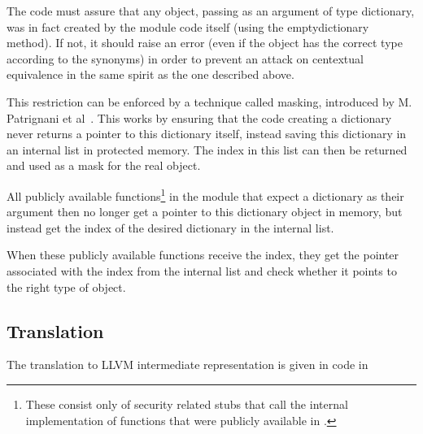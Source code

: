 The code must assure that any object, passing as an argument of type dictionary, was in fact created by the module code itself (using the emptydictionary method). If not, it should raise an error (even if the object has the correct type according to the synonyms) in order to prevent an attack on centextual equivalence in the same spirit as the one described above.

This restriction can be enforced by a technique called masking, introduced by M. Patrignani et al~\cite{Patrignani}. 
This works by ensuring that the code creating a dictionary never returns a pointer to this dictionary itself, instead saving this dictionary in an internal list in protected memory.
The index in this list can then be returned and used as a mask for the real object.

All publicly available functions\footnote{These consist only of security related stubs that call the internal implementation of functions that were publicly available in \MiniML.} in the module that expect a dictionary as their argument then no longer get a pointer to this dictionary object in memory, but instead get the index of the desired dictionary in the internal list.

When these publicly available functions receive the index, they get the pointer associated with the index from the internal list and check whether it points to the right type of object.



\subsection{Translation}
The translation to LLVM intermediate representation is given in code in 

